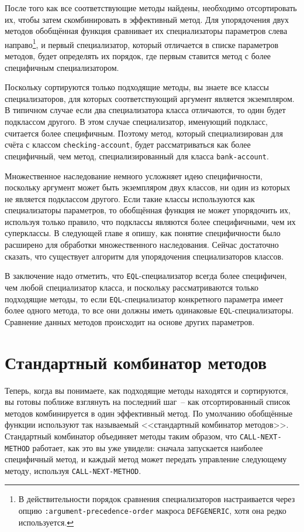 После того как все соответствующие методы найдены, необходимо отсортировать их, чтобы
затем скомбинировать в эффективный метод.  Для упорядочения двух методов обобщённая
функция сравнивает их специализаторы параметров слева направо\footnote{В
  действительности порядок сравнения специализаторов настраивается через опцию
  \lstinline{:argument-precedence-order} макроса \lstinline{DEFGENERIC}, хотя она редко
  используется.}, и первый специализатор, который отличается в списке параметров методов,
будет определять их порядок, где первым ставится метод с более специфичным
специализатором.

Поскольку сортируются только подходящие методы, вы знаете все классы специализаторов, для
которых соответствующий аргумент является экземпляром.  В типичном случае если два
специализатора класса отличаются, то один будет подклассом другого.  В этом случае
специализатор, именующий подкласс, считается более специфичным.  Поэтому метод, который
специализирован для счёта с классом \lstinline{checking-account}, будет рассматриваться как
более специфичный, чем метод, специализированный для класса \lstinline{bank-account}.

Множественное наследование немного усложняет идею специфичности, поскольку аргумент может
быть экземпляром двух классов, ни один из которых не является подклассом другого.  Если
такие классы используются как специализаторы параметров, то обобщённая функция не может
упорядочить их, используя только правило, что подклассы являются более специфичными, чем их
суперклассы.  В следующей главе я опишу, как понятие специфичности было расширено для
обработки множественного наследования.  Сейчас достаточно сказать, что существует алгоритм
для упорядочения специализаторов классов.

В заключение надо отметить, что \lstinline{EQL}-специализатор всегда более специфичен, чем
любой специализатор класса, и поскольку рассматриваются только подходящие методы, то если
\lstinline{EQL}-специализатор конкретного параметра имеет более одного метода, то все они
должны иметь одинаковые \lstinline{EQL}-специализаторы.  Сравнение данных методов происходит на
основе других параметров.

\section{Стандартный комбинатор методов}

Теперь, когда вы понимаете, как подходящие методы находятся и сортируются, вы готовы
поближе взглянуть на последний шаг~-- как отсортированный список методов комбинируется в
один эффективный метод.  По умолчанию обобщённые функции используют так называемый
<<стандартный комбинатор методов>>.  Стандартный комбинатор объединяет методы таким образом,
что \lstinline{CALL-NEXT-METHOD} работает, как это вы уже увидели: сначала запускается
наиболее специфичный метод, и каждый метод может передать управление следующему методу,
используя \lstinline{CALL-NEXT-METHOD}.

